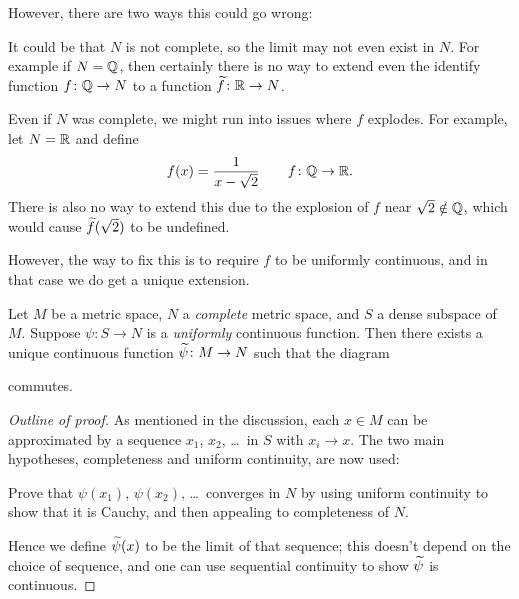 However, there are two ways this could go wrong:
\begin{example}
	\listhack
	\begin{enumerate}[(a)]
		\ii It could be that $N$ is not complete,
		so the limit may not even exist in $N$.
		For example if $N = \mathbb Q$,
		then certainly there is no way to
		extend even the identify function $f \colon \mathbb Q \to N$
		to a function $\widetilde f \colon \mathbb R \to N$.

		\ii Even if $N$ was complete, we might run into issues
		where $f$ explodes.
		For example, let $N = \mathbb R$ and define
		\[ f(x) = \frac{1}{x-\sqrt2} \qquad f \colon \mathbb Q \to \mathbb R. \]
		There is also no way to extend this
		due to the explosion of $f$ near $\sqrt2 \notin \mathbb Q$,
		which would cause $\widetilde f(\sqrt2)$ to be undefined.
	\end{enumerate}
\end{example}
However, the way to fix this is to require $f$ to be uniformly continuous,
and in that case we do get a unique extension.

\begin{theorem}
	Let $M$ be a metric space, $N$ a \emph{complete} metric space,
	and $S$ a dense subspace of $M$.
	Suppose $\psi \colon S \to N$ is a \emph{uniformly} continuous function.
	Then there exists a unique continuous function $\widetilde \psi \colon M \to N$
	such that the diagram
	\begin{center}
	\end{center}
	commutes.
\end{theorem}
\begin{proof}
	[Outline of proof]
	As mentioned in the discussion,
	each $x \in M$ can be approximated by a
	sequence $x_1$, $x_2$, \dots\ in $S$ with $x_i \to x$.
	The two main hypotheses, completeness and uniform continuity,
	are now used:
	\begin{exercise}
		Prove that $\psi(x_1)$, $\psi(x_2)$, \dots\ converges in $N$
		by using uniform continuity to show that it is Cauchy,
		and then appealing to completeness of $N$.
	\end{exercise}
	Hence we define $\widetilde \psi(x)$ to be the limit of that sequence;
	this doesn't depend on the choice of sequence,
	and one can use sequential continuity to show $\widetilde \psi$ is continuous.
\end{proof}

